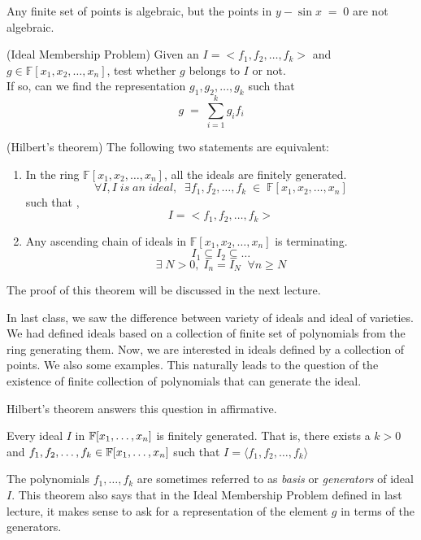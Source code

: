 Any finite set of points is algebraic, but the points in $y-\sin x\;=\;0$ are not algebraic.\\
\begin{definition}(Ideal Membership Problem)
Given an $I = <f_1,f_2, \ldots, f_k>$ and $g \in \mathbb{F}[x_1,x_2,\ldots,x_n]$, test whether $g$ belongs to $I$ or not.\\
If so, can we find the representation $g_1,g_2,\ldots,g_k$ such that $$
	g\;=\;\sum_{i=1}^k g_if_i
$$
\end{definition}
\begin{theorem}(Hilbert's theorem)
The following two statements are equivalent:
\begin{enumerate}
\item In the ring $\mathbb{F}[x_1,x_2,\ldots,x_n]$, all the ideals are finitely generated.\\
$$\forall I, I\;is\;an\;ideal,\;\;\exists f_1,f_2,\ldots,f_k\;\in\;\mathbb{F}[x_1,x_2,\ldots,x_n]$$ 
such that ,$$I = <f_1,f_2,\ldots,f_k>$$
\item Any ascending chain of ideals in $\mathbb{F}[x_1,x_2,\ldots,x_n]$ is terminating.
$$
	I_1 \subseteq I_2\subseteq\ldots
$$
$$
\exists\; N > 0 ,\; I_n = I_N\;\; \forall n \geq N
$$
\end{enumerate}
\end{theorem}
The proof of this theorem will be discussed in the next lecture.

In last class, we saw the difference between variety of ideals and ideal of
varieties. We had defined ideals based on a collection of finite set of
polynomials from the ring generating them. Now, we are interested in
ideals defined by a collection of points. We also some examples. This
naturally leads to the question of the existence of finite collection of
polynomials that can generate the ideal.

Hilbert's theorem answers this question in affirmative.
\begin{theorem}
	Every ideal $I$ in ${\mathbb{F}}[x_1,\ldots,x_n]$ is finitely generated. That
	is, there exists a $k > 0$ and $f_1,f_2,\ldots,f_k \in
	{\mathbb{F}}[x_1,\ldots,x_n]$ such that $I = \langle f_1,f_2,\ldots,f_k \rangle
	$
	\label{thm:hbt}
\end{theorem}
The polynomials $f_1,\ldots,f_k$ are sometimes referred to as \emph{basis} or
\emph{generators} of ideal $I$. This theorem also says that in the Ideal
Membership Problem defined in last
lecture, it makes sense to ask for a representation of the element $g$ in
terms of the generators. 

